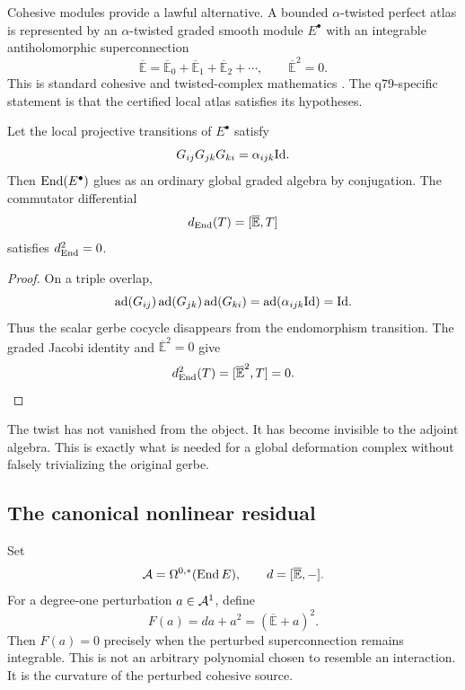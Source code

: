 \documentclass[11pt,a4paper]{article}
\newcommand{\Ebar}{\overline{\mathbb E}}
\newcommand{\ad}{\operatorname{ad}}
\begin{document}
Cohesive modules provide a lawful alternative.  A bounded
\(\alpha\)-twisted perfect atlas is represented by an
\(\alpha\)-twisted graded smooth module \(E^\bullet\) with an integrable
antiholomorphic superconnection
\begin{equation}
\Ebar=\Ebar_0+\Ebar_1+\Ebar_2+\cdots,
\qquad
\Ebar^2=0.
\label{eq:cohesive-superconnection}
\end{equation}
This is standard cohesive and twisted-complex mathematics
\cite{Quillen1985,Block2005,Wei2015,Wei2018,BismutShenWei2021,
BresslerEtAl2007}.  The q79-specific statement is that the certified local
atlas satisfies its hypotheses.

\begin{theorem}
\label{thm:end-untwist}
Let the local projective transitions of \(E^\bullet\) satisfy
\[
G_{ij}G_{jk}G_{ki}=\alpha_{ijk}\mathrm{Id}.
\]
Then \(\operatorname{End}(E^\bullet)\) glues as an ordinary global graded algebra by
conjugation.  The commutator differential
\begin{equation}
d_{\End}(T)=[\Ebar,T]
\label{eq:end-differential}
\end{equation}
satisfies \(d_{\operatorname{End}}^{2}=0\).
\end{theorem}

\begin{proof}
On a triple overlap,
\[
\ad(G_{ij})\ad(G_{jk})\ad(G_{ki})
=\ad(\alpha_{ijk}\Id)=\Id.
\]
Thus the scalar gerbe cocycle disappears from the endomorphism transition.
The graded Jacobi identity and \(\Ebar^2=0\) give
\[
d_{\End}^{2}(T)=[\Ebar^2,T]=0.
\]
\end{proof}

The twist has not vanished from the object.  It has become invisible to the
adjoint algebra.  This is exactly what is needed for a global deformation
complex without falsely trivializing the original gerbe.

\subsection{The canonical nonlinear residual}

Set
\[
\calA=\Omega^{0,*}(\End E),
\qquad d=[\Ebar,-].
\]
For a degree-one perturbation \(a\in\mathcal{A}^1\), define
\begin{equation}
F(a)=da+a^2=(\Ebar+a)^2.
\label{eq:mc-residual}
\end{equation}
Then \(F(a)=0\) precisely when the perturbed superconnection remains
integrable.  This is not an arbitrary polynomial chosen to resemble an
interaction.  It is the curvature of the perturbed cohesive source.
\end{document}
